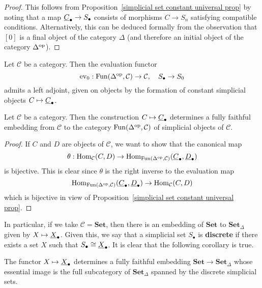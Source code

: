 \begin{proof}
This follows from Proposition~\ref{simplicial set constant universal prop} by noting that a map $\uline{C}_\bullet\to S_\bullet$ consists of morphisms $C\to S_n$ satisfying compatible conditions. Alternatively, this can be deduced formally from the observation that $[0]$ is a final object of the category $\Delta$ (and therefore an initial object of the category $\Delta^{\mathrm{op}}$).
\end{proof}
\begin{corollary}\label{simplicial set evaluation adjoint to constant functor}
Let $\mathcal{C}$ be a category. Then the evaluation functor
\[\mathrm{ev}_0:\mathrm{Fun}(\Delta^{\mathrm{op}},\mathcal{C})\to\mathcal{C},\quad S_\bullet\to S_0\]
admits a left adjoint, given on objects by the formation of constant simplicial objects $C\mapsto\uline{C}_\bullet$.
\end{corollary}
\begin{corollary}\label{simplicial set constant functor is embedding}
Let $\mathcal{C}$ be a category. Then the construction $C\mapsto\uline{C}_\bullet$ determines a fully faithful embedding from $\mathcal{C}$ to the category $\mathrm{Fun}(\Delta^{\mathrm{op}},\mathcal{C})$ of simplicial objects of $\mathcal{C}$.
\end{corollary}
\begin{proof}
If $C$ and $D$ are objects of $\mathcal{C}$, we want to show that the canonical map
\[\theta:\Hom_{\mathcal{C}}(C,D)\to\Hom_{\Fun(\Delta^{\op},\mathcal{C})}(\uline{C}_\bullet,\uline{D}_\bullet)\]
is bijective. This is clear since $\theta$ is the right inverse to the evaluation map
\[\Hom_{\Fun(\Delta^{\op},\mathcal{C})}(\uline{C}_\bullet,\uline{D}_\bullet)\to\Hom_{\mathcal{C}}(C,D)\]
which is bijective in view of Proposition~\ref{simplicial set constant universal prop}.
\end{proof}
In particular, if we take $\mathcal{C}=\mathbf{Set}$, then there is an embedding of $\mathbf{Set}$ to $\mathbf{Set}_{\Delta}$ given by $X\mapsto\uline{X}_\bullet$. Given this, we say that a simplicial set $S_\bullet$ is \textbf{discrete} if there exists a set $X$ such that $S_\bullet\cong\uline{X}_\bullet$. It is clear that the following corollary is true.
\begin{corollary}\label{simplicial set constant functor image is discrete}
The functor $X\mapsto\uline{X}_\bullet$ determines a fully faithful embedding $\mathbf{Set}\to\mathbf{Set}_{\Delta}$ whose essential image is the full subcategory of $\mathbf{Set}_\Delta$ spanned by the discrete simplicial sets.
\end{corollary}
